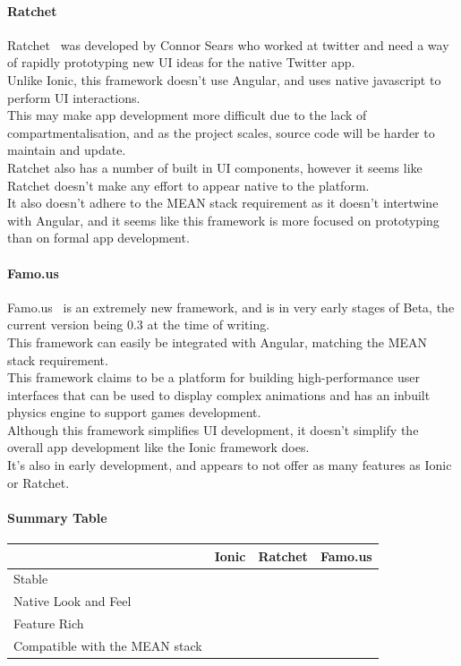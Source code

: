 \documentclass[draft,preprint,12pt,3p]{elsarticle}
\newcommand{\checkmark}{\ding{51}}%
\newcommand{\xmark}{\ding{55}}%
\begin{document}
\paragraph{Ratchet}
Ratchet~\cite{ratchet} was developed by Connor Sears who worked at twitter and need a way of rapidly prototyping new UI ideas for the native Twitter app.\\
Unlike Ionic, this framework doesn't use Angular, and uses native javascript to perform UI interactions.\\
This may make app development more difficult due to the lack of compartmentalisation, and as the project scales, source code will be harder to maintain and update.\\
Ratchet also has a number of built in UI components, however it seems like Ratchet doesn't make any effort to appear native to the platform.\\
It also doesn't adhere to the MEAN stack requirement as it doesn't intertwine with Angular, and it seems like this framework is more focused on prototyping than on formal app development.

\paragraph{Famo.us}
Famo.us~\cite{famous} is an extremely new framework, and is in very early stages of Beta, the current version being 0.3 at the time of writing.\\
This framework can easily be integrated with Angular, matching the MEAN stack requirement.\\
This framework claims to be a platform for building high-performance user interfaces that can be used to display complex animations and has an inbuilt physics engine to support games development.\\
Although this framework simplifies UI development, it doesn't simplify the overall app development like the Ionic framework does.\\
It's also in early development, and appears to not offer as many features as Ionic or Ratchet.

\paragraph{Summary Table}
\begin{tabular}{| l | l | l | l |}
    \hline
          & Ionic & Ratchet & Famo.us \\ \hline
    Stable & \checkmark & \checkmark & \xmark\\ \hline
    Native Look and Feel & \checkmark & \xmark & \checkmark\\ \hline
    Feature Rich & \checkmark & \xmark & \xmark\\ \hline
    Compatible with the MEAN stack & \checkmark & \xmark & \checkmark\\ \hline
\end{tabular}
\end{document}
